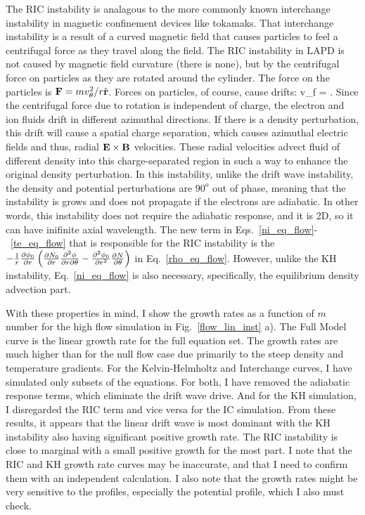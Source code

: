 The RIC instability is analagous to the more commonly known interchange instability in magnetic confinement devices like tokamaks. That interchange instability is a result of a curved magnetic
field that causes particles to feel a centrifugal force as they travel along the field. The RIC instability in LAPD is not caused by magnetic field curvature (there is none), but by the
centrifugal force on particles as they are rotated around the cylinder. The force on the particles is ${\bf F} = m v_\theta^2/r \hat{{\bf r}}$. Forces on particles, of course, cause drifts:
\beq
\label{force_drift}
v_f =  .
\eeq
Since the centrifugal force due to rotation is independent of charge, the electron and ion fluids drift in different azimuthal directions. If there is a density perturbation, this drift will cause
a spatial charge separation, which causes azimuthal electric fields and thus, radial ${\bf E \times B}$ velocities. 
These radial velocities advect fluid of different density into this charge-separated region in such a way to enhance the original density perturbation. In this instability, unlike the drift wave
instability, the density and potential perturbations are $90^o$ out of phase, meaning that the instability is grows and does not propagate if the electrons are adiabatic. In other words,
this instability does not require the adiabatic response, and it is 2D, so it can have inifinite axial wavelength. The new term in Eqs.~\ref{ni_eq_flow}-~\ref{te_eq_flow} that is responsible
for the RIC instability is the $-\frac{1}{r} \frac{\partial\phi_0}{\partial r} \left(\frac{\partial N_0}{\partial r} \frac{\partial^2\phi}{\partial r \partial\theta} - \frac{\partial^2\phi_0}{\partial r^2} \frac{\partial N}{\partial\theta} \right)$ in Eq.~\ref{rho_eq_flow}.
However, unlike the KH instability, Eq.~\ref{ni_eq_flow} is also necessary, specifically, the equilibrium density advection part.


With these properties in mind, I show the growth rates as a function of $m$ number for the high flow simulation in Fig.~\ref{flow_lin_inst} a). The Full Model curve is the linear growth rate
for the full equation set. The growth rates are much higher than for the null flow case due primarily to the steep density and temperature gradients. For the Kelvin-Helmholtz and Interchange
curves, I have simulated only subsets of the equations. For both, I have removed the adiabatic response terms, which eliminate the drift wave drive. And for the KH simulation, I disregarded
the RIC term and vice versa for the IC simulation. From these results, it appears that the linear drift wave is most dominant with the KH instability also having significant positive growth
rate. The RIC instability
is close to marginal with a small positive growth for the most part. I note that the RIC and KH growth rate curves may be inaccurate, and that I need to confirm them with an independent calculation.
I also note that the growth rates might be very sensitive to the profiles, especially the potential profile, which I also must check.

